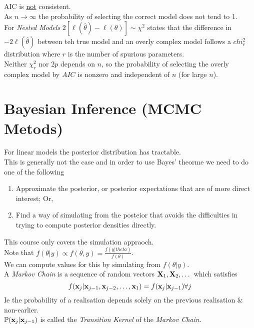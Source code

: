 \documentclass[11pt,a4paper]{article}
\begin{document}
AIC is \underline{not} consistent.\\
As $n\to\infty$ the probability of selecting the correct model does not tend to 1.\\
For \textit{Nested Models} $2[\ell(\hat\theta)-\ell(\theta)]\sim\chi^2$ states that the difference in $-2\ell(\hat\theta)$ between teh true model and an overly complex model follows a $chi^2_r$ distribution where $r$ is the number of spurious parameters.\\
Neither $\chi^2_r$ nor $2p$ depends on $n$, so the probability of selecting the overly complex model by $AIC$ is nonzero and independent of $n$ (for large $n$).

\section{Bayesian Inference (MCMC Metods)}

For linear models the posterior distribution has tractable.\\
This is generally not the case and in order to use Bayes' theorme we need to do one of the following
\begin{enumerate}
	\item Approximate the posterior, or posterior expectations that are of more direct interest; Or,
	\item Find a way of simulating from the posteior that avoids the difficulties in trying to compute posterior densities directly.
\end{enumerate}
\nb This course only covers the simulation appraoch.\\

Note that $f(\theta|y)\propto f(\theta,y)=\frac{f(y|theta)}{f(\theta)}$.\\
We can compute values for this by simulating from $f(\theta|y)$.\\

A \textit{Markov Chain} is a sequence of random vectors $\textbf{X}_1,\textbf{X}_2,\dots$ which satisfies
$$f(\textbf{x}_j|\textbf{x}_{j-1},\textbf{x}_{j-2},\dots,\textbf{x}_1)=f(\textbf{x}_j|\textbf{x}_{j-1})\forall j$$
Ie the probability of a realisation depends solely on the previous realisation \& non-earlier.\\
\nb $\mathbb{P}(\textbf{x}_j|\textbf{x}_{j-1})$ is called the \textit{Transition Kernel} of the \textit{Markov Chain}.\\

\end{document}

